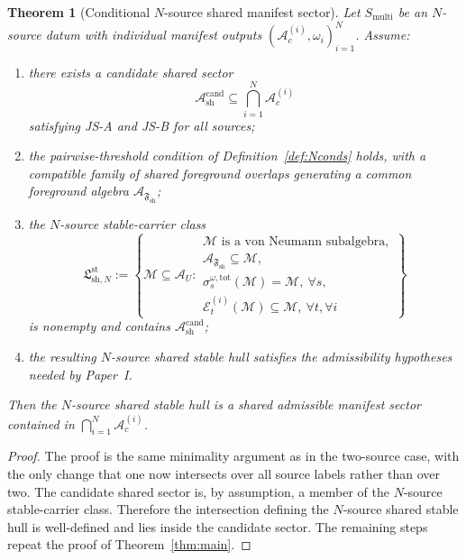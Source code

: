 \documentclass[12pt]{article}
\newtheorem{theorem}{Theorem}[section]
\theoremstyle{definition}
\theoremstyle{remark}
\begin{document}
\begin{theorem}[Conditional \(N\)-source shared manifest sector]
\label{thm:N}
Let \(S_{\mathrm{multi}}\) be an \(N\)-source datum with individual
manifest outputs \((\mathcal A_c^{(i)},\omega_i)_{i=1}^N\). Assume:
\begin{enumerate}
\item there exists a candidate shared sector
  \[
  \mathcal A_{\mathrm{sh}}^{\mathrm{cand}}
  \subseteq
  \bigcap_{i=1}^N \mathcal A_c^{(i)}
  \]
  satisfying JS-A and JS-B for all sources;
\item the pairwise-threshold condition of
  Definition~\ref{def:Nconds} holds, with a compatible family of shared
  foreground overlaps generating a common foreground algebra
  \(\mathcal A_{\mathfrak F_{\mathrm{sh}}}\);
\item the \(N\)-source stable-carrier class
  \[
  \mathfrak L_{\mathrm{sh},N}^{\mathrm{st}}
  :=
  \left\{
  \mathcal M\subseteq\mathcal A_U:
  \begin{array}{l}
  \mathcal M \text{ is a von Neumann subalgebra},\\
  \mathcal A_{\mathfrak F_{\mathrm{sh}}}\subseteq \mathcal M,\\
  \sigma_s^{\omega,\mathrm{tot}}(\mathcal M)=\mathcal M,\ \forall s,\\
  \mathcal E_t^{(i)}(\mathcal M)\subseteq\mathcal M,\ \forall t,\forall i
  \end{array}
  \right\}
  \]
  is nonempty and contains
  \(\mathcal A_{\mathrm{sh}}^{\mathrm{cand}}\);
\item the resulting \(N\)-source shared stable hull satisfies the
  admissibility hypotheses needed by Paper~I.
\end{enumerate}
Then the \(N\)-source shared stable hull is a shared admissible manifest
sector contained in
\(\bigcap_{i=1}^N\mathcal A_c^{(i)}\).
\end{theorem}

\begin{proof}
The proof is the same minimality argument as in the two-source case,
with the only change that one now intersects over all source labels
rather than over two. The candidate shared sector is, by assumption, a
member of the \(N\)-source stable-carrier class. Therefore the
intersection defining the \(N\)-source shared stable hull is
well-defined and lies inside the candidate sector. The remaining steps
repeat the proof of Theorem~\ref{thm:main}.
\end{proof}
\end{document}
